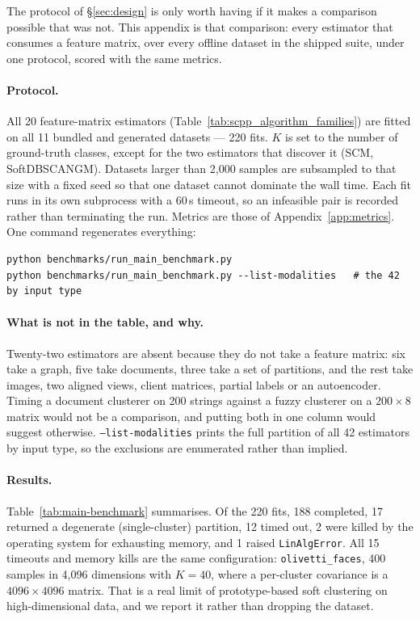\documentclass[twoside,11pt]{article}
\begin{document}
The protocol of \S\ref{sec:design} is only worth having if it makes a
comparison possible that was not. This appendix is that comparison: every
estimator that consumes a feature matrix, over every offline dataset in the
shipped suite, under one protocol, scored with the same metrics.

\paragraph{Protocol.} All 20 feature-matrix estimators
(Table~\ref{tab:scpp_algorithm_families}) are fitted on all 11 bundled and
generated datasets --- 220 fits. $K$ is set to the number of ground-truth
classes, except for the two estimators that discover it (SCM,
SoftDBSCANGM). Datasets larger than 2{,}000 samples are subsampled to that
size with a fixed seed so that one dataset cannot dominate the wall time.
Each fit runs in its own subprocess with a 60\,s timeout, so an infeasible
pair is recorded rather than terminating the run. Metrics are those of
Appendix~\ref{app:metrics}. One command regenerates everything:

\begin{lstlisting}[style=bashstyle, caption={Regenerating the cross-family comparison.}]
python benchmarks/run_main_benchmark.py
python benchmarks/run_main_benchmark.py --list-modalities   # the 42 by input type
\end{lstlisting}

\paragraph{What is not in the table, and why.}
Twenty-two estimators are absent because they do not take a feature matrix:
six take a graph, five take documents, three take a set of partitions, and
the rest take images, two aligned views, client matrices, partial labels or
an autoencoder. Timing a document clusterer on 200 strings against a fuzzy
clusterer on a $200 \times 8$ matrix would not be a comparison, and putting
both in one column would suggest otherwise. \texttt{--list-modalities} prints
the full partition of all 42 estimators by input type, so the exclusions are
enumerated rather than implied.

\paragraph{Results.} Table~\ref{tab:main-benchmark} summarises. Of the 220
fits, 188 completed, 17 returned a degenerate (single-cluster) partition, 12
timed out, 2 were killed by the operating system for exhausting memory, and 1
raised \texttt{LinAlgError}. All 15 timeouts and memory kills are the same
configuration: \texttt{olivetti\_faces}, 400 samples in 4{,}096 dimensions
with $K = 40$, where a per-cluster covariance is a $4096 \times 4096$ matrix.
That is a real limit of prototype-based soft clustering on high-dimensional
data, and we report it rather than dropping the dataset.
\end{document}

